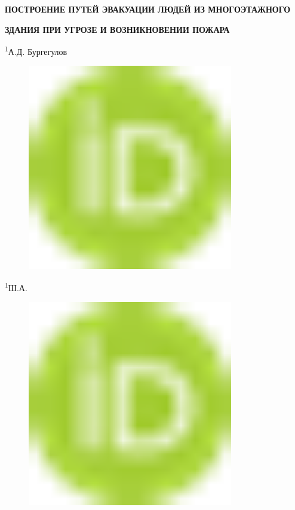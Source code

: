 
{\bfseries ПОСТРОЕНИЕ ПУТЕЙ ЭВАКУАЦИИ ЛЮДЕЙ ИЗ МНОГОЭТАЖНОГО}

{\bfseries ЗДАНИЯ ПРИ УГРОЗЕ И ВОЗНИКНОВЕНИИ ПОЖАРА}

\textsuperscript{1}А.Д. Бургегулов
\begin{figure}[H]
	\centering
	\includegraphics[width=0.8\textwidth]{media/ict2/image6}
	\caption*{}
\end{figure}

\textsuperscript{1}Ш.А.
\begin{figure}[H]
	\centering
	\includegraphics[width=0.8\textwidth]{media/ict2/image6}
	\caption*{}
\end{figure}

